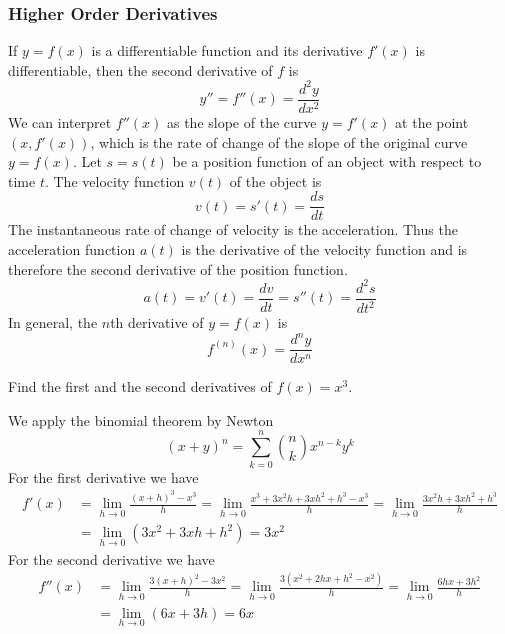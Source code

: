 \subsubsection*{Higher Order Derivatives}
 If \(y=f(x)\) is a differentiable function and its derivative \(f'(x)\) is
 differentiable, then the second derivative of \(f\) is
\[y''=f''(x)=\frac{d^2y}{dx^2}\]
We can interpret \(f''(x)\) as the slope of the curve \(y=f'(x)\) at the point
\((x,f'(x))\), which is the rate of change of the slope of the original curve
\(y=f(x)\).
Let \(s=s(t)\) be a position function of an object with respect to time \(t\).
The velocity function \(v(t)\) of the object is \[v(t)=s'(t)=\frac{ds}{dt}\]
The instantaneous rate of change of velocity is the acceleration.
Thus the acceleration function \(a(t)\) is the derivative of the velocity
function and is therefore the second derivative of the position function.
\[a(t)=v'(t)=\frac{dv}{dt}=s''(t)=\frac{d^2s}{dt^2}\]
In general, the \(n\)th derivative of \(y=f(x)\) is
\[f^{(n)}(x)=\frac{d^ny}{dx^n}\]
\begin{problem}
    Find the first and the second derivatives of \(f(x)=x^3\).
\end{problem}
\begin{solution}
    We apply the binomial theorem by Newton
    \[(x+y)^n=\sum_{k=0}^n \binom{n}{k}x^{n-k}y^k\]
    For the first derivative we have
    \begin{align*}
        f'(x) &= \lim_{h\to 0}\frac{(x+h)^3-x^3}{h}=\lim_{h\to 0}
        \frac{x^3+3x^2h+3xh^2+h^3-x^3}{h}
        =\lim_{h\to 0}\frac{3x^2h+3xh^2+h^3}{h} \\
        &= \lim_{h\to 0}(3x^2+3xh+h^2)=3x^2
    \end{align*}
    For the second derivative we have
    \begin{align*}
        f''(x) &= \lim_{h\to 0}\frac{3(x+h)^2-3x^2}{h}
        =\lim_{h\to 0}\frac{3(x^2+2hx+h^2-x^2)}{h}
        =\lim_{h\to 0}\frac{6hx+3h^2}{h} \\
        &= \lim_{h\to 0}(6x+3h)=6x 
    \end{align*}
\end{solution}